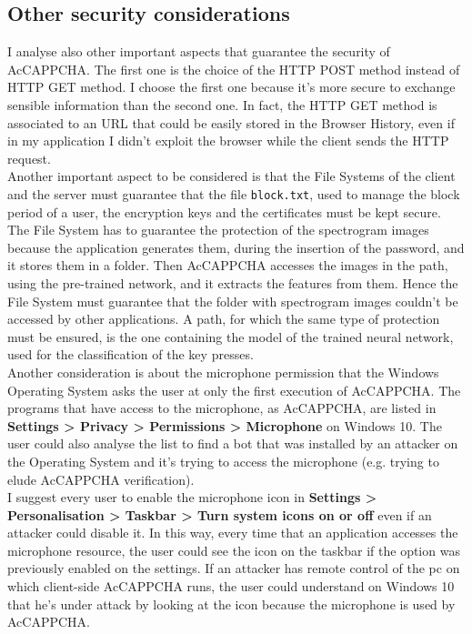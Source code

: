 \subsection{Other security considerations}
I analyse also other important aspects that guarantee the security of AcCAPPCHA. The first one is the choice of the HTTP POST method instead of HTTP GET method. I choose the first one because it's more secure to exchange sensible information than the second one. In fact, the HTTP GET method is associated to an URL that could be easily stored in the Browser History, even if in my application I didn't exploit the browser while the client sends the HTTP request.\\
Another important aspect to be considered is that the File Systems of the client and the server must guarantee that the file \texttt{block.txt}, used to manage the block period of a user, the encryption keys and the certificates must be kept secure. The File System has to guarantee the protection of the spectrogram images because the application generates them, during the insertion of the password, and it stores them in a folder. Then AcCAPPCHA accesses the images in the path, using the pre-trained network, and it extracts the features from them. Hence the File System must guarantee that the folder with spectrogram images couldn't be accessed by other applications. A path, for which the same type of protection must be ensured, is the one containing the model of the trained neural network, used for the classification of the key presses.\\
Another consideration is about the microphone permission that the Windows Operating System asks the user at only the first execution of AcCAPPCHA. The programs that have access to the microphone, as AcCAPPCHA, are listed in \textbf{Settings > Privacy > Permissions > Microphone} on Windows 10. The user could also analyse the list to find a bot that was installed by an attacker on the Operating System and it's trying to access the microphone (e.g. trying to elude AcCAPPCHA verification).\\
I suggest every user to enable the microphone icon in \textbf{Settings > Personalisation > Taskbar > Turn system icons on or off} even if an attacker could disable it. In this way, every time that an application accesses the microphone resource, the user could see the icon on the taskbar if the option was previously enabled on the settings. If an attacker has remote control of the pc on which client-side AcCAPPCHA runs, the user could understand on Windows 10 that he's under attack by looking at the icon because the microphone is used by AcCAPPCHA.\\

